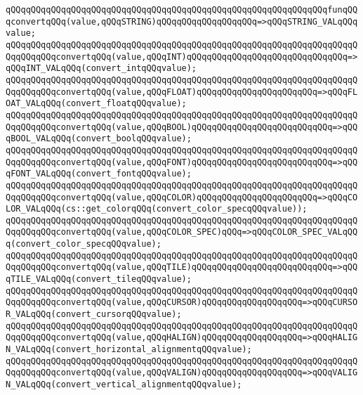 \newline
\verb|qQQqqQQqqQQqqQQqqQQqqQQqqQQqqQQqqQQqqQQqqQQqqQQqqQQqqQQqqQQqqQQqfunqQQqconvertqQQq(value,qQQqSTRING)qQQqqQQqqQQqqQQqqQQq=>qQQqSTRING_VALqQQqvalue;|\newline
\verb|qQQqqQQqqQQqqQQqqQQqqQQqqQQqqQQqqQQqqQQqqQQqqQQqqQQqqQQqqQQqqQQqqQQqqQQqqQQqqQQqconvertqQQq(value,qQQqINT)qQQqqQQqqQQqqQQqqQQqqQQqqQQqqQQq=>qQQqINT_VALqQQq(convert_intqQQqvalue);|\newline
\verb|qQQqqQQqqQQqqQQqqQQqqQQqqQQqqQQqqQQqqQQqqQQqqQQqqQQqqQQqqQQqqQQqqQQqqQQqqQQqqQQqconvertqQQq(value,qQQqFLOAT)qQQqqQQqqQQqqQQqqQQqqQQq=>qQQqFLOAT_VALqQQq(convert_floatqQQqvalue);|\newline
\verb|qQQqqQQqqQQqqQQqqQQqqQQqqQQqqQQqqQQqqQQqqQQqqQQqqQQqqQQqqQQqqQQqqQQqqQQqqQQqqQQqconvertqQQq(value,qQQqBOOL)qQQqqQQqqQQqqQQqqQQqqQQqqQQq=>qQQqBOOL_VALqQQq(convert_boolqQQqvalue);|\newline
\verb|qQQqqQQqqQQqqQQqqQQqqQQqqQQqqQQqqQQqqQQqqQQqqQQqqQQqqQQqqQQqqQQqqQQqqQQqqQQqqQQqconvertqQQq(value,qQQqFONT)qQQqqQQqqQQqqQQqqQQqqQQqqQQq=>qQQqFONT_VALqQQq(convert_fontqQQqvalue);|\newline
\verb|qQQqqQQqqQQqqQQqqQQqqQQqqQQqqQQqqQQqqQQqqQQqqQQqqQQqqQQqqQQqqQQqqQQqqQQqqQQqqQQqconvertqQQq(value,qQQqCOLOR)qQQqqQQqqQQqqQQqqQQqqQQq=>qQQqCOLOR_VALqQQq(cs::get_colorqQQq(convert_color_specqQQqvalue));|\newline
\verb|qQQqqQQqqQQqqQQqqQQqqQQqqQQqqQQqqQQqqQQqqQQqqQQqqQQqqQQqqQQqqQQqqQQqqQQqqQQqqQQqconvertqQQq(value,qQQqCOLOR_SPEC)qQQq=>qQQqCOLOR_SPEC_VALqQQq(convert_color_specqQQqvalue);|\newline
\verb|qQQqqQQqqQQqqQQqqQQqqQQqqQQqqQQqqQQqqQQqqQQqqQQqqQQqqQQqqQQqqQQqqQQqqQQqqQQqqQQqconvertqQQq(value,qQQqTILE)qQQqqQQqqQQqqQQqqQQqqQQqqQQq=>qQQqTILE_VALqQQq(convert_tileqQQqvalue);|\newline
\verb|qQQqqQQqqQQqqQQqqQQqqQQqqQQqqQQqqQQqqQQqqQQqqQQqqQQqqQQqqQQqqQQqqQQqqQQqqQQqqQQqconvertqQQq(value,qQQqCURSOR)qQQqqQQqqQQqqQQqqQQq=>qQQqCURSOR_VALqQQq(convert_cursorqQQqvalue);|\newline
\verb|qQQqqQQqqQQqqQQqqQQqqQQqqQQqqQQqqQQqqQQqqQQqqQQqqQQqqQQqqQQqqQQqqQQqqQQqqQQqqQQqconvertqQQq(value,qQQqHALIGN)qQQqqQQqqQQqqQQqqQQq=>qQQqHALIGN_VALqQQq(convert_horizontal_alignmentqQQqvalue);|\newline
\verb|qQQqqQQqqQQqqQQqqQQqqQQqqQQqqQQqqQQqqQQqqQQqqQQqqQQqqQQqqQQqqQQqqQQqqQQqqQQqqQQqconvertqQQq(value,qQQqVALIGN)qQQqqQQqqQQqqQQqqQQq=>qQQqVALIGN_VALqQQq(convert_vertical_alignmentqQQqvalue);|\newline

